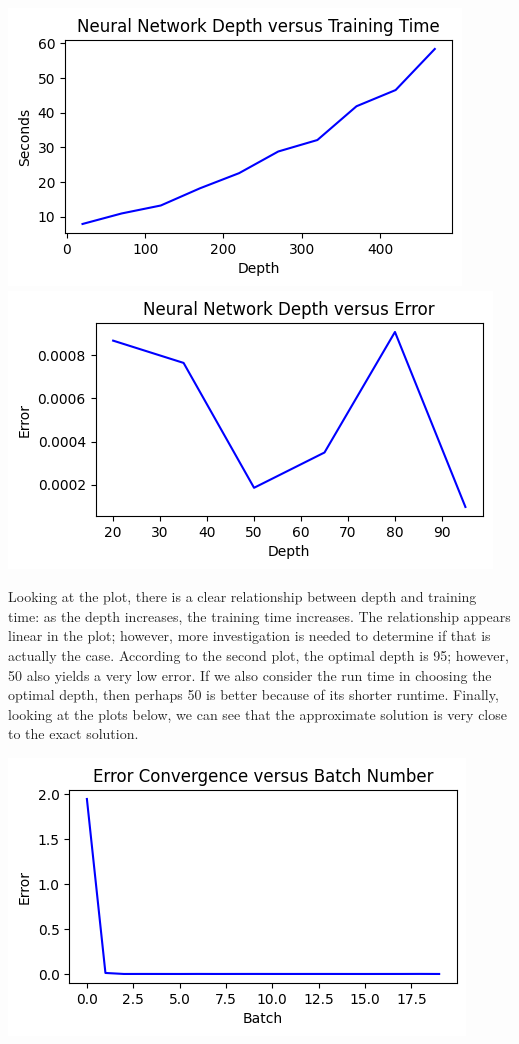 \documentclass[12pt]{article}
\begin{document}
\begin{description}
\begin{minipage}{\linewidth}
        \includegraphics[scale=.5]{images/figure5.png}
        \includegraphics[scale=.5]{images/figure6.png}
    \end{minipage}
    Looking at the plot, there is a clear relationship between depth and
    training time: as the depth increases, the training time increases. The
    relationship appears linear in the plot; however, more investigation is
    needed to determine if that is actually the case. According to the second
    plot, the optimal depth is 95; however, 50 also yields a very low error. If
    we also consider the run time in choosing the optimal depth, then perhaps
    50 is better because of its shorter runtime. Finally, looking at the plots
    below, we can see that the approximate solution is very close to the exact
    solution. \\
    \begin{minipage}{\linewidth}
        \centering
        \includegraphics[scale=.5]{images/figure7.png}

\end{minipage}
\end{description}
\end{document}
